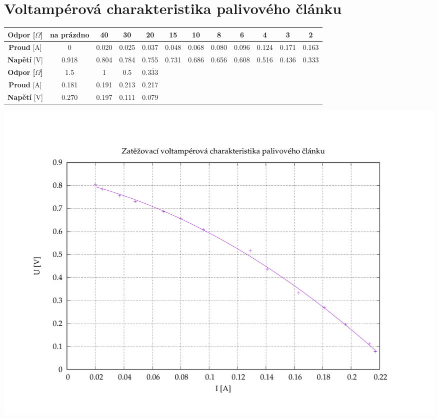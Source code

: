 \documentclass[11pt, a4paper]{report}
\begin{document}
\section{Voltampérová charakteristika palivového článku}


\begin{center}
	\renewcommand{\arraystretch}{1.5}
	\begin{table}[h]
		\centering
		\begin{tabular}{|c|c|c|c|c|c|c|c|c|c|c|c|}

			\hline
			\textbf{Odpor [$\Omega$]} & na prázdno & 40    & 30    & 20                 & 15    & 10    & 8     & 6     & 4     & 3     & 2     \\

			\hline
			\textbf{Proud} [A]        & 0          & 0.020 & 0.025 & 0.037              & 0.048 & 0.068 & 0.080 & 0.096 & 0.124 & 0.171 & 0.163 \\
			\hline

			\hline
			\textbf{Napětí} [V]       & 0.918      & 0.804 & 0.784 & 0.755              & 0.731 & 0.686 & 0.656 & 0.608 & 0.516 & 0.436 & 0.333 \\
			\hline
			\hline
			\hline
			\textbf{Odpor [$\Omega$]} & 1.5        & 1     & 0.5   & 0.$\overline{333}$ &       &       &       &       &       &       &       \\

			\hline
			\textbf{Proud} [A]        & 0.181      & 0.191 & 0.213 & 0.217              &       &       &       &       &       &       &       \\

			\hline
			\textbf{Napětí} [V]       & 0.270      & 0.197 & 0.111 & 0.079              &       &       &       &       &       &       &       \\
			\hline
		\end{tabular}
	\end{table}


	\includegraphics[width=1\textwidth, trim=1.5cm 1cm 3cm 1cm, clip]{VA_paliv.pdf}
\end{center}
\end{document}
